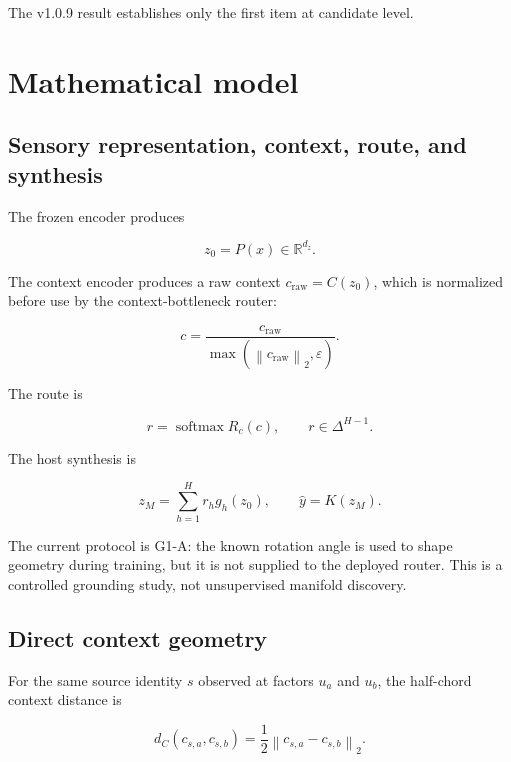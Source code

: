 \documentclass[11pt,a4paper]{article}
\newcommand{\R}{\mathbb{R}}
\newcommand{\norm}[1]{\left\lVert #1 \right\rVert}
\begin{document}
The v1.0.9 result establishes only the first item at candidate level.

\section{Mathematical model}

\subsection{Sensory representation, context, route, and synthesis}

The frozen encoder produces

\begin{equation}
 z_0=P(x)\in\R^{d_z}.
\end{equation}

The context encoder produces a raw context $c_{\mathrm{raw}}=C(z_0)$, which is normalized before use by the context-bottleneck router:

\begin{equation}
 c = \frac{c_{\mathrm{raw}}}{\max(\norm{c_{\mathrm{raw}}}_2,\varepsilon)}.
\end{equation}

The route is

\begin{equation}
 r=\operatorname{softmax}R_c(c),\qquad r\in\Delta^{H-1}.
\end{equation}

The host synthesis is

\begin{equation}
 z_M=\sum_{h=1}^{H}r_h g_h(z_0),\qquad \hat y=K(z_M).
\end{equation}

The current protocol is G1-A: the known rotation angle is used to shape geometry during training, but it is not supplied to the deployed router. This is a controlled grounding study, not unsupervised manifold discovery.

\subsection{Direct context geometry}

For the same source identity $s$ observed at factors $u_a$ and $u_b$, the half-chord context distance is

\begin{equation}
 d_C(c_{s,a},c_{s,b})=\frac12\norm{c_{s,a}-c_{s,b}}_2.
\end{equation}
\end{document}
